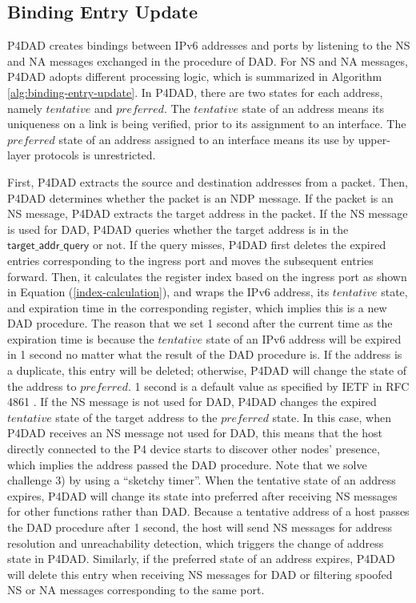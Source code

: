 \documentclass[journal]{IEEEtran}
\begin{document}
    \subsection{Binding Entry Update}\label{sec:binding-entry-update}
        P4DAD creates bindings between IPv6 addresses and ports by listening to the NS and NA messages exchanged in the procedure of DAD. For NS and NA messages, P4DAD adopts different processing logic, which is summarized in Algorithm \ref{alg:binding-entry-update}. In P4DAD, there are two states for each address, namely $tentative$ and $preferred$. The $tentative$ state of an address means its uniqueness on a link is being verified, prior to its assignment to an interface. The $preferred$ state of an address assigned to an interface means its use by upper-layer protocols is unrestricted.

        First, P4DAD extracts the source and destination addresses from a packet. Then, P4DAD determines whether the packet is an NDP message. If the packet is an NS message, P4DAD extracts the target address in the packet. If the NS message is used for DAD, P4DAD queries whether the target address is in the $\mathsf{target\_addr\_query}$ or not. If the query misses, P4DAD first deletes the expired entries corresponding to the ingress port and moves the subsequent entries forward. Then, it calculates the register index based on the ingress port as shown in Equation (\ref{index-calculation}), and wraps the IPv6 address, its $tentative$ state, and expiration time in the corresponding register, which implies this is a new DAD procedure. The reason that we set 1 second after the current time as the expiration time is because the $tentative$ state of an IPv6 address will be expired in 1 second no matter what the result of the DAD procedure is. If the address is a duplicate, this entry will be deleted; otherwise, P4DAD will change the state of the address to $preferred$. 1 second is a default value as specified by IETF in RFC 4861 \cite{NDP}.
        If the NS message is not used for DAD, P4DAD changes the expired $tentative$ state of the target address to the $preferred$ state. In this case, when P4DAD receives an NS message not used for DAD, this means that the host directly connected to the P4 device starts to discover other nodes' presence, which implies the address passed the DAD procedure. Note that we solve challenge 3) by using a ``sketchy timer''. When the tentative state of an address expires, P4DAD will change its state into preferred after receiving NS messages for other functions rather than DAD. Because a tentative address of a host passes the DAD procedure after 1 second, the host will send NS messages for address resolution and unreachability detection, which triggers the change of address state in P4DAD. Similarly, if the preferred state of an address expires, P4DAD will delete this entry when receiving NS messages for DAD or filtering spoofed NS or NA messages corresponding to the same port.
\end{document}
